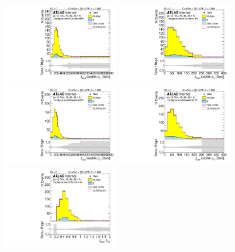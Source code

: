 \begin{figure}[htbp!]
\begin{center}
\includegraphics[width=0.45\textwidth,angle=-90]{figures/boosted/Signal/b77_ThreeTag_Signal_leadHCand_trk0_Pt_blind.pdf}
\includegraphics[width=0.45\textwidth,angle=-90]{figures/boosted/Signal/b77_ThreeTag_Signal_leadHCand_trk1_Pt_blind.pdf}\\
\includegraphics[width=0.45\textwidth,angle=-90]{figures/boosted/Signal/b77_ThreeTag_Signal_sublHCand_trk0_Pt_blind.pdf}
\includegraphics[width=0.45\textwidth,angle=-90]{figures/boosted/Signal/b77_ThreeTag_Signal_sublHCand_trk1_Pt_blind.pdf}\\
\includegraphics[width=0.45\textwidth,angle=-90]{figures/boosted/Signal/b77_ThreeTag_Signal_leadHCand_trk_dr_blind.pdf}

\end{center}
\end{figure}
